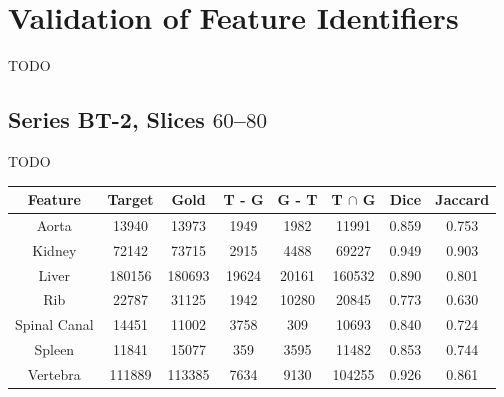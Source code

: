 
\section{Validation of Feature Identifiers}

TODO

\subsection{Series BT-2, Slices $60$--$80$}

TODO

\begin{center}
\begin{tabular}{cccccccc}
\scriptsize \textbf{Feature} & \scriptsize \textbf{Target} & \scriptsize \textbf{Gold} & \scriptsize \textbf{T - G} & \scriptsize \textbf{G - T} & \scriptsize \textbf{T $\cap$ G} & \scriptsize \textbf{Dice} & \scriptsize \textbf{Jaccard} \\
\hline
\scriptsize Aorta & \scriptsize 13940 & \scriptsize 13973 & \scriptsize 1949 & \scriptsize 1982 & \scriptsize 11991 & \scriptsize 0.859 & \scriptsize 0.753 \\
\scriptsize Kidney & \scriptsize 72142 & \scriptsize 73715 & \scriptsize 2915 & \scriptsize 4488 & \scriptsize 69227 & \scriptsize 0.949 & \scriptsize 0.903 \\
\scriptsize Liver & \scriptsize 180156 & \scriptsize 180693 & \scriptsize 19624 & \scriptsize 20161 & \scriptsize 160532 & \scriptsize 0.890 & \scriptsize 0.801 \\
\scriptsize Rib & \scriptsize 22787 & \scriptsize 31125 & \scriptsize 1942 & \scriptsize 10280 & \scriptsize 20845 & \scriptsize 0.773 & \scriptsize 0.630 \\
\scriptsize Spinal Canal & \scriptsize 14451 & \scriptsize 11002 & \scriptsize 3758 & \scriptsize 309 & \scriptsize 10693 & \scriptsize 0.840 & \scriptsize 0.724 \\
\scriptsize Spleen & \scriptsize 11841 & \scriptsize 15077 & \scriptsize 359 & \scriptsize 3595 & \scriptsize 11482 & \scriptsize 0.853 & \scriptsize 0.744 \\
\scriptsize Vertebra & \scriptsize 111889 & \scriptsize 113385 & \scriptsize 7634 & \scriptsize 9130 & \scriptsize 104255 & \scriptsize 0.926 & \scriptsize 0.861 \\
\end{tabular}
\end{center}

